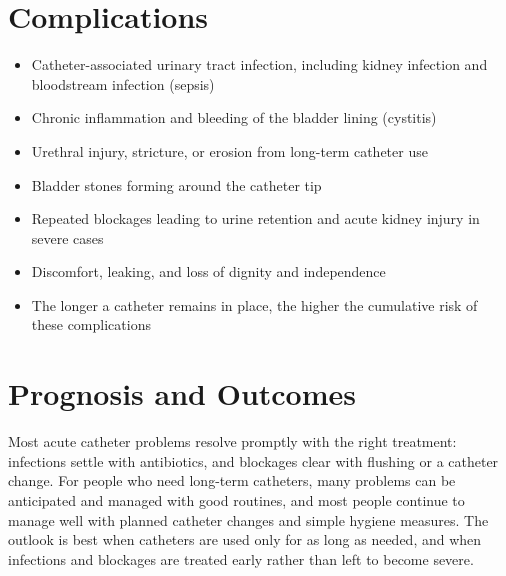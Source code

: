 \section*{Complications}
\begin{itemize}
    \item Catheter-associated urinary tract infection, including kidney infection and bloodstream infection (sepsis)
    \item Chronic inflammation and bleeding of the bladder lining (cystitis)
    \item Urethral injury, stricture, or erosion from long-term catheter use
    \item Bladder stones forming around the catheter tip
    \item Repeated blockages leading to urine retention and acute kidney injury in severe cases
    \item Discomfort, leaking, and loss of dignity and independence
    \item The longer a catheter remains in place, the higher the cumulative risk of these complications
\end{itemize}

\section*{Prognosis and Outcomes}
Most acute catheter problems resolve promptly with the right treatment: infections settle with antibiotics, and blockages clear with flushing or a catheter change. For people who need long-term catheters, many problems can be anticipated and managed with good routines, and most people continue to manage well with planned catheter changes and simple hygiene measures. The outlook is best when catheters are used only for as long as needed, and when infections and blockages are treated early rather than left to become severe.

